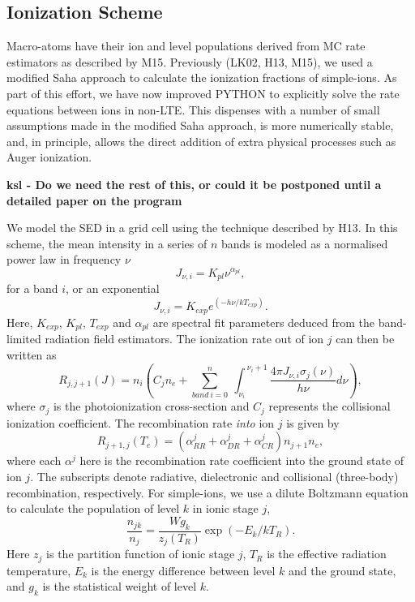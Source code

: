 \documentclass[preprint, a4paper, 11pt]{aastex}
\begin{document}
\subsection{Ionization Scheme}

Macro-atoms have their ion and level populations derived from
MC rate estimators as described by M15. Previously (LK02, H13, M15),
we used a modified Saha approach to calculate the ionization fractions
of simple-ions. As part of  this effort, we have now improved {\sc PYTHON} to explicitly solve the 
rate equations between ions in non-LTE. 
This dispenses with a number of small assumptions made in the modified Saha approach, 
is more numerically stable, 
and, in principle, allows the direct addition of extra physical 
processes such as Auger ionization.

{\bf ksl - Do we need the rest of this, or could it be postponed until a detailed paper on the program }

We model the SED in a grid cell using the technique described by H13. In this scheme,
the mean intensity in a series of $n$ bands is modeled as a normalised power law in 
frequency $\nu$
\begin{equation}
J_{\nu,i}=K_{pl}\nu^{\alpha_{pl}},
\end{equation}
for a band $i$, or an exponential 
\begin{equation}
J_{\nu,i}=K_{exp} e^{(-h\nu/k T_{exp})}.
\end{equation}
Here, $K_{exp}$, $K_{pl}$, $T_{exp}$ and $\alpha_{pl}$ are spectral fit parameters
deduced from the band-limited radiation field estimators.
The ionization rate out of ion $j$ can then be written as 
\begin{equation}
R_{j,j+1}(J)= 
\displaystyle{
n_i \left(C_{j} n_e + 
\sum_{band~i=0}^{n}~
{\int_{\nu_i}^{~\nu_i+1} \frac{4 \pi J_{\nu,i}\sigma_j(\nu)}  {h \nu} d\nu}
\right),}
\end{equation}
where $\sigma_j$ is the photoionization cross-section and $C_{j}$
represents the collisional ionization coefficient.
The recombination rate {\em into} ion $j$ is given by 
\begin{equation}
R_{j+1,j}(T_e) = (\alpha^j_{RR} + \alpha^j_{DR} + \alpha^j_{CR}) n_{j+1} n_e,
\end{equation}
where each $\alpha^j$ here is the recombination rate coefficient into the ground state of ion $j$.
The subscripts denote radiative, dielectronic and 
collisional (three-body) recombination, respectively.
For simple-ions, we use a dilute Boltzmann equation to calculate 
the population of level $k$ in ionic stage $j$,
\begin{equation}
\frac{n_{jk}}{n_j} = \frac{W g_k}{z_j(T_R)} \exp(-E_k/kT_R).
\end{equation}
Here $z_j$ is the partition function of ionic stage $j$,
$T_R$ is the effective radiation temperature,
$E_k$ is the energy difference between level $k$ and the ground state,
and $g_k$ is the statistical weight of level $k$. 
\end{document}
